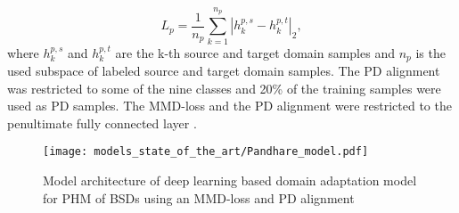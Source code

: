 \begin{equation}
    L_{p} = \frac{1}{n_{p}}\sum_{k=1}^{n_{p}}|h_{k}^{p,s}-h_{k}^{p,t}|_{2}, 
\end{equation}
where $h_{k}^{p,s}$ and $h_{k}^{p,t}$ are the k-th source and target domain samples and $n_{p}$ is the used subspace of labeled source and target domain samples. The PD alignment was restricted to some of the nine classes and 20\% of the training samples were used as PD samples. The MMD-loss and the PD alignment were restricted to the penultimate fully connected layer \cite{Pandhare2021}.
\begin{figure}[H]
  \centering
  \texttt{[image: models\_state\_of\_the\_art/Pandhare\_model.pdf]}
  \caption{Model architecture of deep learning based domain adaptation model for PHM of BSDs using an MMD-loss and PD alignment \cite{Pandhare2021}}
  \label{fig:Pandhare_model}
\end{figure}

